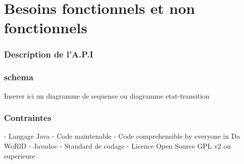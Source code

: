\chapter{Besoins fonctionnels et non fonctionnels}

\subsection{Description de l'A.P.I}


\subsection{schema}

Inserer ici un diagramme de sequence ou diagramme etat-transition


\subsection{Contraintes}

- Langage Java
- Code maintenable
- Code comprehensible by everyone in Da WoRlD
- Javadoc
- Standard de codage
- Licence Open Source GPL v2 ou superieure


